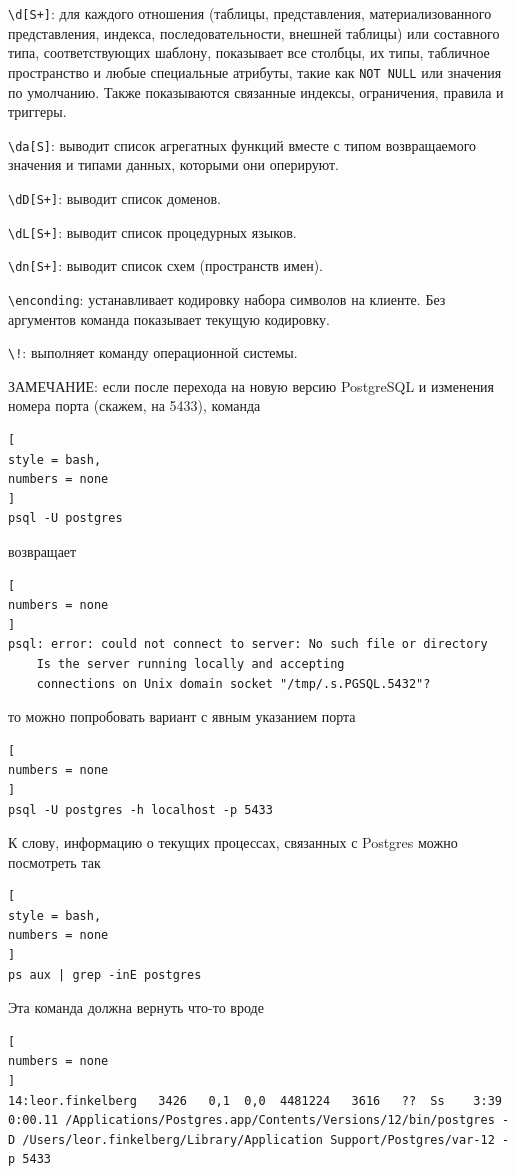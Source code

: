 \documentclass[%
	11pt,
	a4paper,
	utf8,
		]{article}
\begin{document}
\noindent \verb|\d[S+]|: для каждого отношения (таблицы, представления, материализованного представления, индекса, последовательности, внешней таблицы) или составного типа, соответствующих шаблону, показывает все столбцы, их типы, табличное пространство и любые специальные атрибуты, такие как \texttt{NOT NULL} или значения по умолчанию. Также показываются связанные индексы, ограничения, правила и триггеры.

\noindent\verb|\da[S]|: выводит список агрегатных функций вместе с типом возвращаемого значения и типами данных, которыми они оперируют.

\noindent\verb|\dD[S+]|: выводит список доменов.

\noindent\verb|\dL[S+]|: выводит список процедурных языков.

\noindent\verb|\dn[S+]|: выводит список схем (пространств имен).

\noindent\verb|\enconding|: устанавливает кодировку набора символов на клиенте. Без аргументов команда показывает текущую кодировку.

\noindent\verb|\!|: выполняет команду операционной системы.

ЗАМЕЧАНИЕ: если после перехода на новую версию PostgreSQL и изменения номера порта (скажем, на 5433), команда
\begin{lstlisting}[
style = bash,
numbers = none	
]
psql -U postgres
\end{lstlisting}
возвращает
\begin{lstlisting}[
numbers = none	
]
psql: error: could not connect to server: No such file or directory
    Is the server running locally and accepting
    connections on Unix domain socket "/tmp/.s.PGSQL.5432"?
\end{lstlisting}
то можно попробовать вариант с явным указанием порта
\begin{lstlisting}[
numbers = none	
]
psql -U postgres -h localhost -p 5433
\end{lstlisting}

К слову, информацию о текущих процессах, связанных с Postgres можно посмотреть так
\begin{lstlisting}[
style = bash,
numbers = none	
]
ps aux | grep -inE postgres
\end{lstlisting}

Эта команда должна вернуть что-то вроде
\begin{lstlisting}[
numbers = none	
]
14:leor.finkelberg   3426   0,1  0,0  4481224   3616   ??  Ss    3:39     0:00.11 /Applications/Postgres.app/Contents/Versions/12/bin/postgres -D /Users/leor.finkelberg/Library/Application Support/Postgres/var-12 -p 5433
\end{lstlisting}
\end{document}
